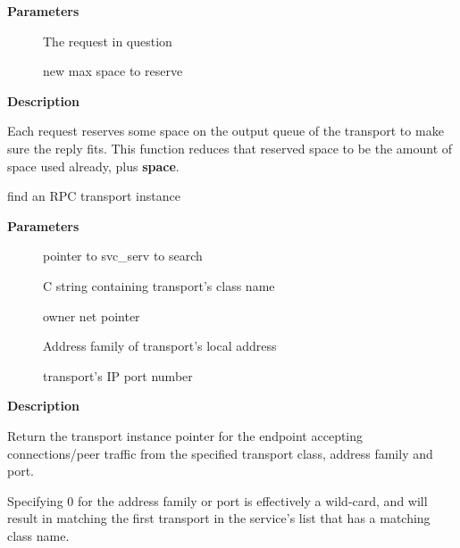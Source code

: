 \documentclass[a4paper,8pt,english]{sphinxmanual}
\begin{document}
\textbf{Parameters}
\begin{description}
\item[{}] \leavevmode
The request in question

\item[{}] \leavevmode
new max space to reserve

\end{description}

\textbf{Description}

Each request reserves some space on the output queue of the transport
to make sure the reply fits.  This function reduces that reserved
space to be the amount of space used already, plus \textbf{space}.

\begin{fulllineitems}
\label{networking/kapi:c.svc_find_xprt}
find an RPC transport instance

\end{fulllineitems}


\textbf{Parameters}
\begin{description}
\item[{}] \leavevmode
pointer to svc\_serv to search

\item[{}] \leavevmode
C string containing transport's class name

\item[{}] \leavevmode
owner net pointer

\item[{}] \leavevmode
Address family of transport's local address

\item[{}] \leavevmode
transport's IP port number

\end{description}

\textbf{Description}

Return the transport instance pointer for the endpoint accepting
connections/peer traffic from the specified transport class,
address family and port.

Specifying 0 for the address family or port is effectively a
wild-card, and will result in matching the first transport in the
service's list that has a matching class name.
\end{document}
